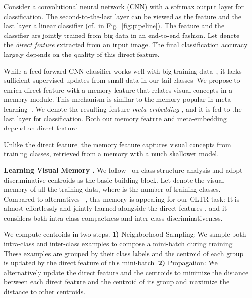 \documentclass[10pt,twocolumn,letterpaper]{article}
\begin{document}
Consider a convolutional neural network (CNN) with a softmax output layer for classification. The  second-to-the-last layer can be viewed as the feature and  the last layer a linear classifier (cf.\  in Fig.~\ref{fig:pipeline}).
The feature and the classifier are jointly trained from big data in an end-to-end fashion.  Let  denote the {\it direct feature} extracted from an input image.  The final classification accuracy largely depends on the quality of this direct feature.

While a feed-forward CNN classifier works well with big training data~\cite{deng2009imagenet, krizhevsky2012imagenet}, it lacks sufficient supervised updates from small data in our tail classes.  We propose to enrich direct feature  with a memory feature  that relates visual concepts in a memory module.  This mechanism is similar to the memory popular in meta learning~\cite{santoro2016meta, munkhdalai2017meta}. We denote the resulting feature  {\it meta embedding} , and it is fed to the last layer for classification. 
Both our memory feature  and  meta-embedding  depend on direct feature .





Unlike the direct feature, the memory feature captures visual concepts from training classes, retrieved from a memory with a much shallower model.

\vspace{2pt}
\noindent
\textbf{Learning Visual Memory .}
We follow~\cite{hsu2017learning} on class structure analysis and adopt discriminative centroids as the basic building block.  Let  denote the visual memory of all the training data,  where  is the number of training classes.
Compared to alternatives ~\cite{wen2016discriminative, snell2017prototypical}, this memory is appealing for our OLTR task:  It is almost effortlessly and jointly learned alongside the direct features , and it considers both intra-class compactness and inter-class discriminativeness.  


We compute centroids in two steps.
{\bf 1)} Neighborhood Sampling: We sample both intra-class and inter-class examples to compose a mini-batch during training. These examples are grouped by their class labels and the centroid  of each group is updated by the direct feature of this mini-batch. {\bf 2)} Propagation: We alternatively update the direct feature  and the centroids to minimize the distance between each direct feature and the centroid of its group and maximize the distance to other centroids.  
\end{document}
